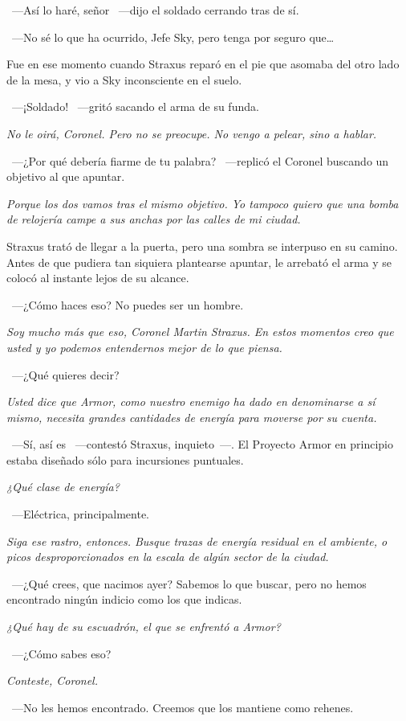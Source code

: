 ~---Así lo haré, señor ~---dijo el soldado cerrando tras de sí.

~---No sé lo que ha ocurrido, Jefe Sky, pero tenga por seguro que\dots

Fue en ese momento cuando Straxus reparó en el pie que asomaba del otro lado de la mesa, y vio a Sky inconsciente en el suelo.

~---¡Soldado! ~---gritó sacando el arma de su funda.

\emph{No le oirá, Coronel. Pero no se preocupe. No vengo a pelear, sino a hablar.}

~---¿Por qué debería fiarme de tu palabra? ~---replicó el Coronel buscando un objetivo al que apuntar.

\emph{Porque los dos vamos tras el mismo objetivo. Yo tampoco quiero que una bomba de relojería campe a sus anchas por las calles de mi ciudad.}

Straxus trató de llegar a la puerta, pero una sombra se interpuso en su camino. Antes de que pudiera tan siquiera plantearse apuntar, le arrebató el arma y se colocó al instante lejos de su alcance.

~---¿Cómo haces eso? No puedes ser un hombre.

\emph{Soy mucho más que eso, Coronel Martin Straxus. En estos momentos creo que usted y yo podemos entendernos mejor de lo que piensa.}

~---¿Qué quieres decir?

\emph{Usted dice que Armor, como nuestro enemigo ha dado en denominarse a sí mismo, necesita grandes cantidades de energía para moverse por su cuenta.}

~---Sí, así es ~---contestó Straxus, inquieto~---. El Proyecto Armor en principio estaba diseñado sólo para incursiones puntuales.

\emph{¿Qué clase de energía?}

~---Eléctrica, principalmente.

\emph{Siga ese rastro, entonces. Busque trazas de energía residual en el ambiente, o picos desproporcionados en la escala de algún sector de la ciudad.}

~---¿Qué crees, que nacimos ayer? Sabemos lo que buscar, pero no hemos encontrado ningún indicio como los que indicas.

\emph{¿Qué hay de su escuadrón, el que se enfrentó a Armor?}

~---¿Cómo sabes eso?

\emph{Conteste, Coronel.}

~---No les hemos encontrado. Creemos que los mantiene como rehenes.

